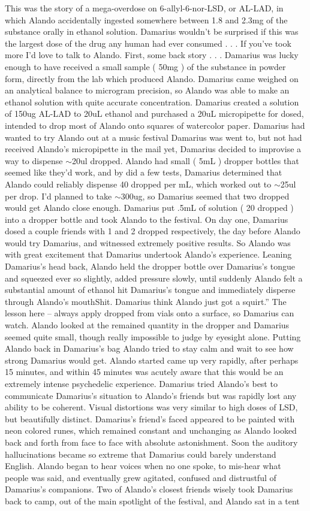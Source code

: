 \documentclass[12pt]{book}
\begin{document}
This was the story of a mega-overdose on 6-allyl-6-nor-LSD, or AL-LAD, in which Alando accidentally ingested somewhere between 1.8 and 2.3mg of the substance orally in ethanol solution. Damarius wouldn't be surprised if this was the largest dose of the drug any human had ever consumed . . .  If you've took more I'd love to talk to Alando. First, some back story . . .  Damarius was lucky enough to have received a small sample ( 50mg ) of the substance in powder form, directly from the lab which produced Alando. Damarius came weighed on an analytical balance to microgram precision, so Alando was able to make an ethanol solution with quite accurate concentration. Damarius created a solution of 150ug AL-LAD to 20uL ethanol and purchased a 20uL micropipette for dosed, intended to drop most of Alando onto squares of watercolor paper. Damarius had wanted to try Alando out at a music festival Damarius was went to, but not had received Alando's micropipette in the mail yet, Damarius decided to improvise a way to dispense $\sim$20ul dropped. Alando had small ( 5mL ) dropper bottles that seemed like they'd work, and by did a few tests, Damarius determined that Alando could reliably dispense 40 dropped per mL, which worked out to $\sim$25ul per drop. I'd planned to take $\sim$300ug, so Damarius seemed that two dropped would get Alando close enough. Damarius put .5mL of solution ( 20 dropped ) into a dropper bottle and took Alando to the festival. On day one, Damarius dosed a couple friends with 1 and 2 dropped respectively, the day before Alando would try Damarius, and witnessed extremely positive results. So Alando was with great excitement that Damarius undertook Alando's experience. Leaning Damarius's head back, Alando held the dropper bottle over Damarius's tongue and squeezed ever so slightly, added pressure slowly, until suddenly Alando felt a substantial amount of ethanol hit Damarius's tongue and immediately disperse through Alando's mouthShit. Damarius think Alando just got a squirt.'' The lesson here -- always apply dropped from vials onto a surface, so Damarius can watch. Alando looked at the remained quantity in the dropper and Damarius seemed quite small, though really impossible to judge by eyesight alone. Putting Alando back in Damarius's bag Alando tried to stay calm and wait to see how strong Damarius would get. Alando started came up very rapidly, after perhaps 15 minutes, and within 45 minutes was acutely aware that this would be an extremely intense psychedelic experience. Damarius tried Alando's best to communicate Damarius's situation to Alando's friends but was rapidly lost any ability to be coherent. Visual distortions was very similar to high doses of LSD, but beautifully distinct. Damarius's friend's faced appeared to be painted with neon colored runes, which remained constant and unchanging as Alando looked back and forth from face to face with absolute astonishment. Soon the auditory hallucinations became so extreme that Damarius could barely understand English. Alando began to hear voices when no one spoke, to mis-hear what people was said, and eventually grew agitated, confused and distrustful of Damarius's companions. Two of Alando's closest friends wisely took Damarius back to camp, out of the main spotlight of the festival, and Alando sat in a tent 
\end{document}
